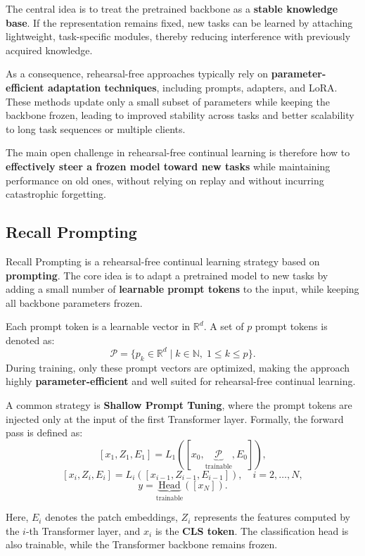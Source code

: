 The central idea is to treat the pretrained backbone as a \textbf{stable knowledge base}.
If the representation remains fixed, new tasks can be learned by attaching lightweight,
task-specific modules, thereby reducing interference with previously acquired knowledge.

As a consequence, rehearsal-free approaches typically rely on
\textbf{parameter-efficient adaptation techniques}, including prompts, adapters, and
LoRA. These methods update only a small subset of parameters while keeping the backbone
frozen, leading to improved stability across tasks and better scalability to long task
sequences or multiple clients.

The main open challenge in rehearsal-free continual learning is therefore how to
\textbf{effectively steer a frozen model toward new tasks} while maintaining performance
on old ones, without relying on replay and without incurring catastrophic forgetting.

\subsection{Recall Prompting}

Recall Prompting is a rehearsal-free continual learning strategy based on
\textbf{prompting}. The core idea is to adapt a pretrained model to new tasks by adding a
small number of \textbf{learnable prompt tokens} to the input, while keeping all backbone
parameters frozen.

Each prompt token is a learnable vector in $\mathbb{R}^d$. A set of $p$ prompt tokens is
denoted as:
\[
\mathcal{P} = \{ p_k \in \mathbb{R}^d \mid k \in \mathbb{N}, \; 1 \leq k \leq p \}.
\]
During training, only these prompt vectors are optimized, making the approach highly
\textbf{parameter-efficient} and well suited for rehearsal-free continual learning.

A common strategy is \textbf{Shallow Prompt Tuning}, where the prompt tokens are injected
only at the input of the first Transformer layer. Formally, the forward pass is defined
as:
\[
[x_1, Z_1, E_1] = L_1([x_0, \underbrace{\mathcal{P}}_{\text{trainable}}, E_0]),
\]
\[
[x_i, Z_i, E_i] = L_i([x_{i-1}, Z_{i-1}, E_{i-1}]), \quad i = 2, \dots, N,
\]
\[
y = \underbrace{\text{Head}}_{\text{trainable}}([x_N]).
\]

Here, $E_i$ denotes the patch embeddings, $Z_i$ represents the features computed by the
$i$-th Transformer layer, and $x_i$ is the \textbf{CLS token}. The classification head is
also trainable, while the Transformer backbone remains frozen.

